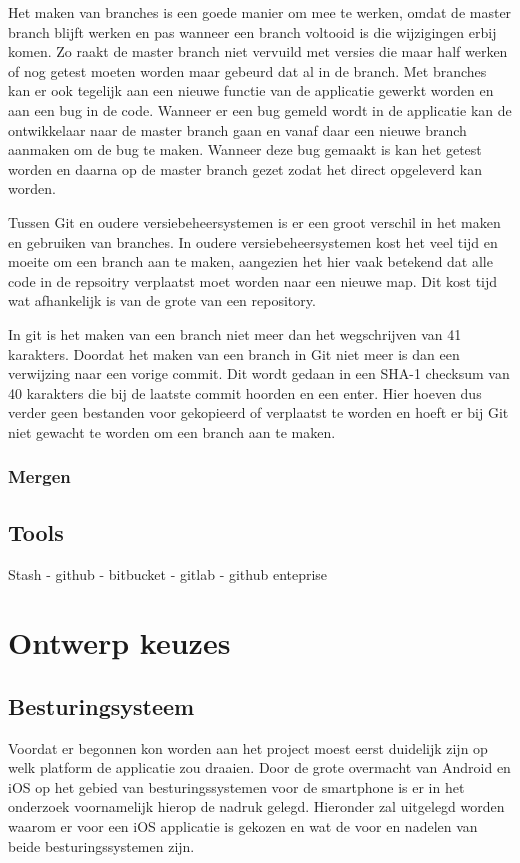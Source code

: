 \documentclass[a4paper,11pt,oneside]{report}
\begin{document}
Het maken van branches is een goede manier om mee te werken, omdat de master branch blijft werken en pas wanneer een branch voltooid is die wijzigingen erbij komen. Zo raakt de master branch niet vervuild met versies die maar half werken of nog getest moeten worden maar gebeurd dat al in de branch. Met branches kan er ook tegelijk aan een nieuwe functie van de applicatie gewerkt worden en aan een bug in de code. Wanneer er een bug gemeld wordt in de applicatie kan de ontwikkelaar naar de master branch gaan en vanaf daar een nieuwe branch aanmaken om de bug te maken. Wanneer deze bug gemaakt is kan het getest worden en daarna op de master branch gezet zodat het direct opgeleverd kan worden.

Tussen Git en oudere versiebeheersystemen is er een groot verschil in het maken en gebruiken van branches. In oudere versiebeheersystemen kost het veel tijd en moeite om een branch aan te maken, aangezien het hier vaak betekend dat alle code in de repsoitry verplaatst moet worden naar een nieuwe map. Dit kost tijd wat afhankelijk is van de grote van een repository. 

In git is het maken van een branch niet meer dan het wegschrijven van 41 karakters. Doordat het maken van een branch in Git niet meer is dan een verwijzing naar een vorige commit. Dit wordt gedaan in een SHA-1 checksum van 40 karakters die bij de laatste commit hoorden en een enter. Hier hoeven dus verder geen bestanden voor gekopieerd of verplaatst te worden en hoeft er bij Git niet gewacht te worden om een branch aan te maken. 

\subsection{Mergen}



\section{Tools}
Stash - github - bitbucket - gitlab - github enteprise


\chapter{Ontwerp keuzes}

\section{Besturingsysteem}
Voordat er begonnen kon worden aan het project moest eerst duidelijk zijn op
welk platform de applicatie zou draaien. Door de grote overmacht van Android en
iOS op het gebied van besturingssystemen voor de smartphone is er in het
onderzoek voornamelijk hierop de nadruk gelegd. Hieronder zal uitgelegd worden
waarom er voor een iOS applicatie is gekozen en wat de voor en nadelen van beide
besturingssystemen zijn.
\end{document}
